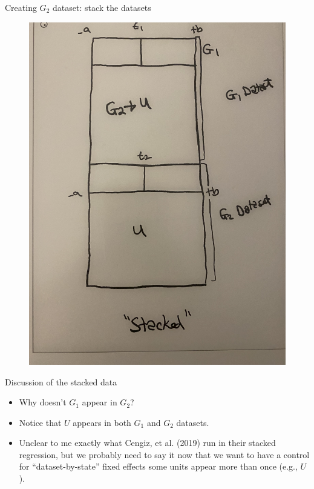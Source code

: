 \documentclass{beamer}
\begin{document}
\begin{frame}{Creating $G_2$ dataset: stack the datasets}

	\begin{figure}
	\includegraphics[scale=0.06]{./lecture_includes/stacked6.jpg}
	\end{figure}

\end{frame}



\begin{frame}{Discussion of the stacked data}

\begin{itemize}
\item Why doesn't $G_1$ appear in $G_2$?
\item Notice that $U$ appears in both $G_1$ and $G_2$ datasets. 
\item Unclear to me exactly what Cengiz, et al. (2019) run in their stacked regression, but we probably need to say it now that we want to have a control for ``dataset-by-state'' fixed effects some units appear more than once (e.g., $U$).
\end{itemize}

\end{frame}
\end{document}
